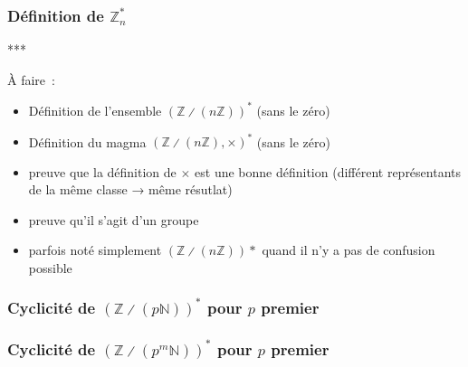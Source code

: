 \done

\subsubsection{Définition de \texorpdfstring{$\mathbb{Z}_n^*$}{Zn*}}

***

À faire : 
\begin{itemize}[nosep]
    \item Définition de l'ensemble $\left( \mathbb{Z} \divslash (n \mathbb{Z}) \right)^*$ (sans le zéro)
    \item Définition du magma $\left( \mathbb{Z} \divslash (n \mathbb{Z}), \times \right)^*$ (sans le zéro)
    \item preuve que la définition de $\times$ est une bonne définition (différent représentants de la même classe → même résutlat)
    \item preuve qu'il s'agit d'un groupe
    \item parfois noté simplement $\left( \mathbb{Z} \divslash (n \mathbb{Z}) \right) *$ quand il n'y a pas de confusion possible
\end{itemize}

\subsubsection{Cyclicité de \texorpdfstring{$\left( \mathbb{Z} \divslash (p \mathbb{N}) \right)^*$}{(Z / p Z)*} pour \texorpdfstring{$p$}{p} premier}

\subsubsection{Cyclicité de \texorpdfstring{$\left( \mathbb{Z} \divslash (p^m \mathbb{N}) \right)^*$}{(Z / p m Z)*} pour \texorpdfstring{$p$}{p} premier}
